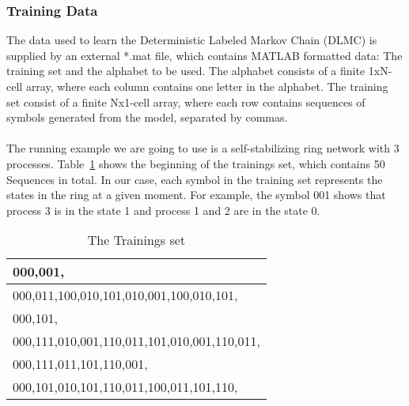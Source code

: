 \documentclass[
a4paper,     %
12pt         %
]{scrartcl}  %
\begin{document}
\begin{figure}[H]
\begin{center}
\end{center}
     \label{fig:diaAalergia}
\end{figure}

\subsubsection{Training Data}

The data used to learn the Deterministic Labeled Markov Chain (DLMC) is supplied by an external *.mat file, which contains MATLAB formatted data: The training set and the alphabet to be used. The alphabet consists of a finite 1xN-cell array, where each column contains one letter in the alphabet. The training set consist of a finite Nx1-cell array, where each row contains sequences of symbols generated from the model, separated by commas.
\paragraph{}
The running example we are going to use is a self-stabilizing ring network with 3 processes.
Table~\ref{table:trainingsSet} shows the beginning of the trainings set, which contains 50 Sequences in total.  In our case, each symbol in the training set represents the states in the ring at a given moment. For example, the symbol 001 shows that process 3 is in the state 1 and process 1 and 2 are in the state 0.

\begin{table}[ht!]
\centering
\begin{tabular}{|l|}
\hline
000,001,                                    \\ \hline
000,011,100,010,101,010,001,100,010,101,   \\ \hline
000,101,                                    \\ \hline
000,111,010,001,110,011,101,010,001,110,011, \\ \hline
000,111,011,101,110,001,                    \\ \hline
000,101,010,101,110,011,100,011,101,110,    \\ \hline
\end{tabular}
\caption{The Trainings set} 
\label{table:trainingsSet}
\end{table}
\end{document}
